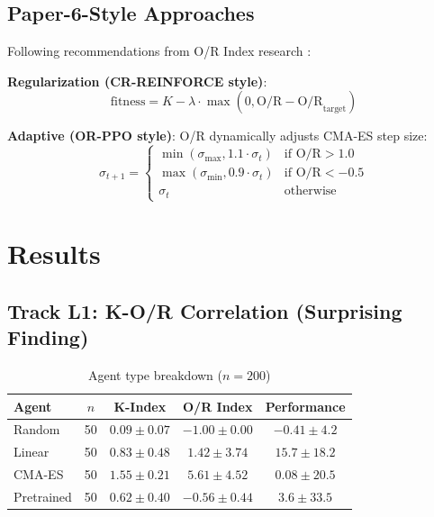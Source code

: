 \documentclass[twoside]{article}
\theoremstyle{remark}
\begin{document}
\subsection{Paper-6-Style Approaches}

Following recommendations from O/R Index research \citep{or2025}:

\textbf{Regularization (CR-REINFORCE style)}:
\begin{equation}
\text{fitness} = K - \lambda \cdot \max(0, \text{O/R} - \text{O/R}_{\text{target}})
\end{equation}

\textbf{Adaptive (OR-PPO style)}: O/R dynamically adjusts CMA-ES step size:
\begin{equation}
\sigma_{t+1} = \begin{cases}
\min(\sigma_{\max}, 1.1 \cdot \sigma_t) & \text{if O/R} > 1.0 \\
\max(\sigma_{\min}, 0.9 \cdot \sigma_t) & \text{if O/R} < -0.5 \\
\sigma_t & \text{otherwise}
\end{cases}
\end{equation}

\section{Results}

\subsection{Track L1: K-O/R Correlation (Surprising Finding)}

\begin{table}[h]
\centering
\caption{Agent type breakdown ($n = 200$)}
\label{tab:agents}
\begin{tabular}{@{}lcccc@{}}
\toprule
\textbf{Agent} & $n$ & \textbf{K-Index} & \textbf{O/R Index} & \textbf{Performance} \\
\midrule
Random & 50 & $0.09 \pm 0.07$ & $-1.00 \pm 0.00$ & $-0.41 \pm 4.2$ \\
Linear & 50 & $0.83 \pm 0.48$ & $1.42 \pm 3.74$ & $15.7 \pm 18.2$ \\
CMA-ES & 50 & $1.55 \pm 0.21$ & $5.61 \pm 4.52$ & $0.08 \pm 20.5$ \\
Pretrained & 50 & $0.62 \pm 0.40$ & $-0.56 \pm 0.44$ & $3.6 \pm 33.5$ \\
\bottomrule
\end{tabular}
\end{table}
\end{document}
